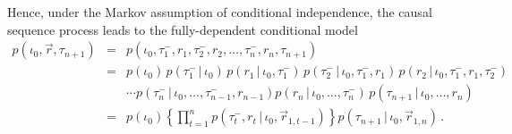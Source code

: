 \documentclass[a4paper]{article}
\newcommand{\vr}{\vec{r}}
\newcommand{\tm}{\tau^{-}}
\begin{document}
Hence, under the Markov assumption of conditional independence,
the causal sequence process leads to the fully-dependent conditional model
\begin{eqnarray}
p(\iota_0,\vr,\tau_{n+1}) & = &
p(\iota_0,\tm_1,r_1,\tm_2,r_2,\ldots,\tm_n,r_n,\tau_{n+1})
\nonumber\\
& = &
p(\iota_0)
\,p(\tm_1\,|\,\iota_0)
\,p(r_1\,|\,\iota_0,\tm_1)
\,p(\tm_2\,|\,\iota_0,\tm_1,r_1)
\, p(r_2\,|\,\iota_0,\tm_1,r_1,\tm_2)
\nonumber\\
&&
\cdots
p(\tm_n\,|\,\iota_0,\ldots,\tm_{n-1},r_{n-1})
p(r_n\,|\,\iota_0,\ldots,\tm_{n})
\, p(\tau_{n+1}\,|\,\iota_0,\ldots,r_n)
\nonumber\\
& = &
p(\iota_0)
\left\{\prod_{t=1}^{n}p(\tm_t,r_t\,|\,\iota_0,\vr_{1,t-1})\right\}
 p(\tau_{n+1}\,|\,\iota_0,\vr_{1,n})
\,.
\label{eq:temporal-model-full}
\end{eqnarray}
\end{document}

